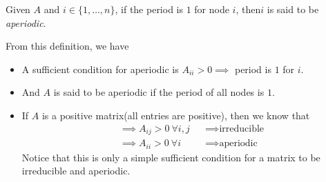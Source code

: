 \begin{definition}[Aperiodic]
	Given \(A\) and \(i\in\{1, \ldots , n\}\), if the period is \(1\) for node \(i\), then\(i\) is said to be \emph{aperiodic}.
\end{definition}
\begin{remark}
	From this definition, we have
	\begin{itemize}
		\item A sufficient condition for aperiodic is \(A_{ii} > 0 \implies \) period is \(1\) for \(i\).
		\item And \(A\) is said to be aperiodic if the period of all nodes is \(1\).
		\item If \(A\) is a positive matrix(all entries are positive), then we know that
		      \[
			      \begin{alignedat}{3}
				      &\implies A_{ij}>0\ \forall i, j &&\implies \text{irreducible}\\
				      &\implies A_{ii}>0\ \forall i &&\implies \text{aperiodic}
			      \end{alignedat}
		      \]
		      Notice that this is only a simple sufficient condition for a matrix to be irreducible and aperiodic.
	\end{itemize}
\end{remark}

